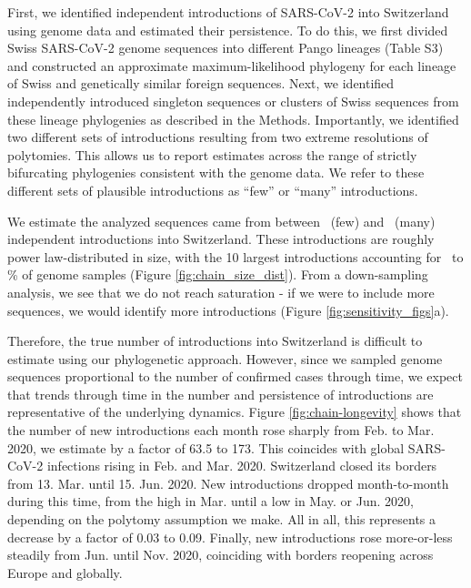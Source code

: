 \documentclass[9pt,twoside,lineno]{pnas-new} %
\begin{document}
First, we identified independent introductions of SARS-CoV-2 into Switzerland using genome data and estimated their persistence. To do this, we first divided Swiss SARS-CoV-2 genome sequences into different Pango lineages (Table S3) and constructed an approximate maximum-likelihood phylogeny for each lineage of Swiss and genetically similar foreign sequences. Next, we identified independently introduced singleton sequences or clusters of Swiss sequences from these lineage phylogenies as described in the Methods. Importantly, we identified two different sets of introductions resulting from two extreme resolutions of polytomies. This allows us to report estimates across the range of strictly bifurcating phylogenies consistent with the genome data. We refer to these different sets of plausible introductions as ``few'' or ``many'' introductions.

We estimate the analyzed sequences came from between \nchainsmin\ (few) and \nchainsmax\ (many) independent introductions into Switzerland. These introductions are roughly power law-distributed in size, with the 10 largest introductions accounting for \maxlargestchainsper\ to \minlargestchainsper \% of genome samples (Figure \ref{fig:chain_size_dist}). From a down-sampling analysis, we see that we do not reach saturation - if we were to include more sequences, we would identify more introductions (Figure \ref{fig:sensitivity_figs}a). 


Therefore, the true number of introductions into Switzerland is difficult to estimate using our phylogenetic approach. However, since we sampled genome sequences proportional to the number of confirmed cases through time, we expect that trends through time in the number and persistence of introductions are representative of the underlying dynamics. Figure \ref{fig:chain-longevity} shows that the number of new introductions each month rose sharply from Feb. to Mar. 2020, we estimate by a factor of 63.5 to 173. This coincides with global SARS-CoV-2 infections rising in Feb. and Mar. 2020. Switzerland closed its borders from 13. Mar. until 15. Jun. 2020. New introductions dropped month-to-month during this time, from the high in Mar. until a low in May. or Jun. 2020, depending on the polytomy assumption we make. All in all, this represents a decrease by a factor of 0.03 to 0.09. Finally, new introductions rose more-or-less steadily from Jun. until Nov. 2020, coinciding with borders reopening across Europe and globally. 
\end{document}
